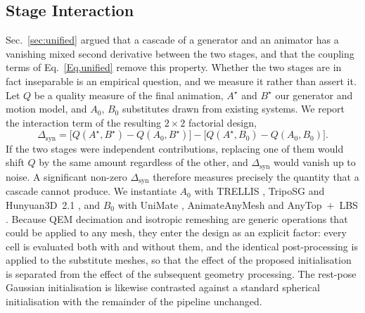 \documentclass[lettersize,journal]{IEEEtran}
\begin{document}
\subsection{Stage Interaction} \label{sec:interaction}
Sec.~\ref{sec:unified} argued that a cascade of a generator and an animator has a vanishing
mixed second derivative between the two stages, and that the coupling terms of
Eq.~\ref{Eq.unified} remove this property. Whether the two stages are in fact inseparable is
an empirical question, and we measure it rather than assert it. Let $Q$ be a quality measure
of the final animation, $A^{\star}$ and $B^{\star}$ our generator and motion model, and
$A_{0}$, $B_{0}$ substitutes drawn from existing systems. We report the interaction term of
the resulting $2\times2$ factorial design,
\begin{equation} \label{Eq.syn}
\Delta_{\text{syn}}=
\big[Q(A^{\star},B^{\star})-Q(A_{0},B^{\star})\big]-
\big[Q(A^{\star},B_{0})-Q(A_{0},B_{0})\big].
\end{equation}
If the two stages were independent contributions, replacing one of them would shift $Q$ by the
same amount regardless of the other, and $\Delta_{\text{syn}}$ would vanish up to noise. A
significant non-zero $\Delta_{\text{syn}}$ therefore measures precisely the quantity that a
cascade cannot produce. We instantiate $A_{0}$ with TRELLIS \cite{xiang2025structured},
TripoSG \cite{li2025triposg} and Hunyuan3D~2.1 \cite{hunyuan3d2025hunyuan3d}, and $B_{0}$ with
UniMate \cite{mou2026unimate}, AnimateAnyMesh \cite{wu2025animateanymesh} and
AnyTop~$+$~LBS \cite{gat2025anytop}. Because QEM decimation and isotropic remeshing are
generic operations that could be applied to any mesh, they enter the design as an explicit
factor: every cell is evaluated both with and without them, and the identical post-processing
is applied to the substitute meshes, so that the effect of the proposed initialisation is
separated from the effect of the subsequent geometry processing. The rest-pose Gaussian
initialisation is likewise contrasted against a standard spherical initialisation with the
remainder of the pipeline unchanged.

\end{document}
